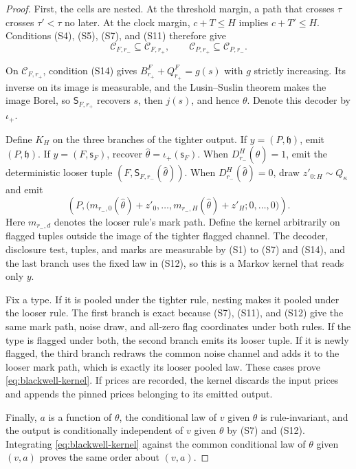 \begin{proof}
First, the cells are nested. At the threshold margin, a path that crosses $\tau$ crosses
$\tau'<\tau$ no later. At the clock margin, $c+T\leq H$ implies $c+T'\leq H$. Conditions (S4),
(S5), (S7), and (S11) therefore give
\begin{equation}
\label{eq:blackwell-nesting}
\mathcal C_{F,r_-}\subseteq\mathcal C_{F,r_+},
\qquad
\mathcal C_{P,r_+}\subseteq\mathcal C_{P,r_-}.
\end{equation}

On $\mathcal C_{F,r_+}$, condition (S14) gives
$B^F_{r_+}+Q^F_{r_+}=g(s)$ with $g$ strictly increasing. Its inverse on its image is measurable,
and the Lusin--Suslin theorem makes the image Borel, so $\mathsf S_{F,r_+}$ recovers $s$, then
$j(s)$, and hence $\theta$. Denote this decoder by
$\iota_+$.

Define $K_H$ on the three branches of the tighter output. If $y=(P,\mathfrak h)$, emit
$(P,\mathfrak h)$. If $y=(F,\mathsf s_F)$, recover
$\widehat\theta=\iota_+(\mathsf s_F)$. When $D_{r_-}^H(\widehat\theta)=1$, emit the deterministic
looser tuple $(F,\mathsf S_{F,r_-}(\widehat\theta))$. When
$D_{r_-}^H(\widehat\theta)=0$, draw $z'_{0:H}\sim Q_\kappa$ and emit
\[
\left(P,
\bigl(m_{r_-,0}(\widehat\theta)+z'_0,\ldots,m_{r_-,H}(\widehat\theta)+z'_H;
0,\ldots,0\bigr)\right).
\]
Here $m_{r_-,d}$ denotes the looser rule's mark path.
Define the kernel arbitrarily on flagged tuples outside the image of the tighter flagged channel.
The decoder, disclosure test, tuples, and marks are measurable by (S1) to (S7) and (S14), and the
last branch uses the fixed law in (S12), so this is a Markov kernel that reads only $y$.

Fix a type. If it is pooled under the tighter rule, nesting makes it pooled under the looser rule.
The first branch is exact because (S7), (S11), and (S12) give the same mark path, noise draw, and
all-zero flag coordinates under both rules. If the type is flagged under both, the second branch
emits its looser tuple. If it is newly flagged, the third branch redraws the common noise channel
and adds it to the looser mark path, which is exactly its looser pooled law. These cases prove
\eqref{eq:blackwell-kernel}. If prices are recorded, the kernel discards the input prices and
appends the pinned prices belonging to its emitted output.

Finally, $a$ is a function of $\theta$, the conditional law of $v$ given $\theta$ is
rule-invariant, and the output is conditionally independent of $v$ given $\theta$ by (S7) and
(S12). Integrating \eqref{eq:blackwell-kernel} against the common conditional law of $\theta$
given $(v,a)$ proves the same order about $(v,a)$.
\end{proof}

